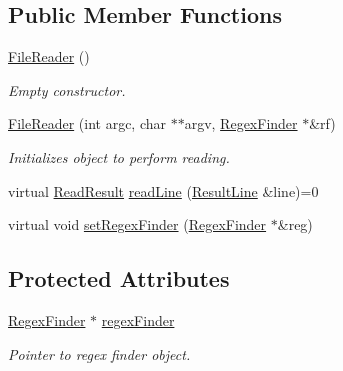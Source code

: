 \subsection*{Public Member Functions}
\begin{DoxyCompactItemize}
\item 
\hypertarget{class_file_reader_a615dcb2443cad1f2ca123c7c0c334480}{\hyperlink{class_file_reader_a615dcb2443cad1f2ca123c7c0c334480}{File\-Reader} ()}\label{class_file_reader_a615dcb2443cad1f2ca123c7c0c334480}

\begin{DoxyCompactList}\small\item\em Empty constructor. \end{DoxyCompactList}\item 
\hyperlink{class_file_reader_addc591dc8120f70da096ffd3365071b9}{File\-Reader} (int argc, char $\ast$$\ast$argv, \hyperlink{class_regex_finder}{Regex\-Finder} $\ast$\&rf)
\begin{DoxyCompactList}\small\item\em Initializes object to perform reading. \end{DoxyCompactList}\item 
virtual \hyperlink{class_file_reader_a8e801198c62f657dd1dff8fd8dbe796f}{Read\-Result} \hyperlink{class_file_reader_aa5e7dfefb3249a68497e40ddc0fd37f8}{read\-Line} (\hyperlink{class_result_line}{Result\-Line} \&line)=0
\item 
virtual void \hyperlink{class_file_reader_a5ddc14179401245f69f75ef32610132d}{set\-Regex\-Finder} (\hyperlink{class_regex_finder}{Regex\-Finder} $\ast$\&reg)
\end{DoxyCompactItemize}
\subsection*{Protected Attributes}
\begin{DoxyCompactItemize}
\item 
\hypertarget{class_file_reader_af8ad2862e80be4d46ee35570db428f3c}{\hyperlink{class_regex_finder}{Regex\-Finder} $\ast$ \hyperlink{class_file_reader_af8ad2862e80be4d46ee35570db428f3c}{regex\-Finder}}\label{class_file_reader_af8ad2862e80be4d46ee35570db428f3c}

\begin{DoxyCompactList}\small\item\em Pointer to regex finder object. \end{DoxyCompactList}\end{DoxyCompactItemize}


